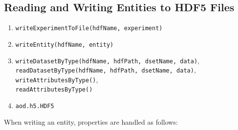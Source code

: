 \documentclass[10pt]{exam}
\newcommand\aodclass[1]{\textcolor{codeblue}{\texttt{#1}}}
\newcommand\aodfcn[1]{\textcolor{darkteal}{\texttt{#1}}}
\begin{document}
	\subsection{Reading and Writing Entities to HDF5 Files}
		\label{subsection:HDFIO}
		\begin{enumerate}
			\item \aodfcn{writeExperimentToFile(hdfName, experiment)}
			\item \aodfcn{writeEntity(hdfName, entity)}
			\item \aodfcn{writeDatasetByType(hdfName, hdfPath, dsetName, data)},\\ \aodfcn{readDatasetByType(hdfName, hdfPath, dsetName, data)},\\ 
			\aodfcn{writeAttributesByType()},\\ \aodfcn{readAttributesByType()}
			\item \aodclass{aod.h5.HDF5}
		\end{enumerate}
		\noindent When writing an entity, properties are handled as follows:
\end{document}
